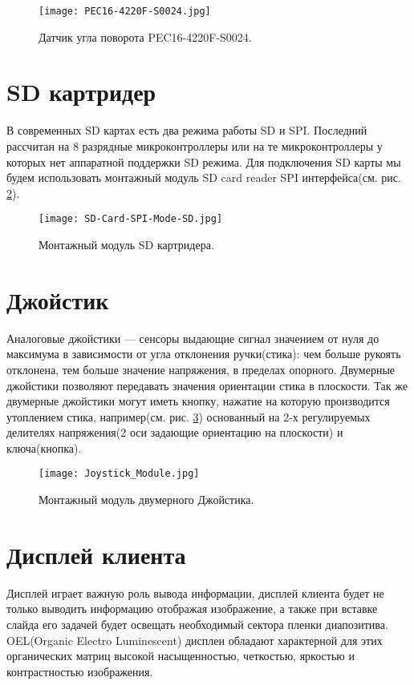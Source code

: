 \begin{figure}[ht]
	\centering
     \texttt{[image: PEC16-4220F-S0024.jpg]}
	\caption
	{
	Датчик угла поворота PEC16-4220F-S0024.
	}
	\label{fig:PEC16-4220F-S0024}
\end{figure}

\section{SD картридер}
В современных SD картах есть два режима работы SD и SPI. Последний рассчитан на 8 разрядные микроконтроллеры или  на те микроконтроллеры у которых нет аппаратной поддержки SD режима. Для подключения SD карты мы будем использовать монтажный модуль SD card reader SPI интерфейса(см. рис. \ref{fig:SDCardF}).
\begin{figure}[ht]
	\centering
     \texttt{[image: SD-Card-SPI-Mode-SD.jpg]}
	\caption
	{
	Монтажный модуль SD картридера.
	}
	\label{fig:SDCardF}
\end{figure}

\section{Джойстик}
Аналоговые джойстики — сенсоры выдающие сигнал значением от нуля до максимума в зависимости от угла отклонения ручки(стика): чем больше рукоять отклонена, тем больше значение напряжения, в пределах опорного. Двумерные джойстики позволяют передавать значения ориентации стика в плоскости. Так же двумерные джойстики могут иметь кнопку, нажатие на которую производится утоплением стика, например(см. рис. \ref{fig:JoystickModuleF}) основанный на 2-х регулируемых делителях напряжения(2 оси задающие ориентацию на плоскости) и ключа(кнопка).
\begin{figure}[ht]
	\centering
     \texttt{[image: Joystick\_Module.jpg]}
	\caption
	{
	Монтажный модуль двумерного Джойстика.
	}
	\label{fig:JoystickModuleF}
\end{figure}

\section{Дисплей клиента}
Дисплей играет важную роль вывода информации, дисплей клиента будет не только выводить информацию отображая изображение, а также при вставке слайда его задачей будет освещать необходимый сектора пленки диапозитива. OEL(Organic Electro Luminescent) дисплеи обладают характерной для этих органических матриц высокой насыщенностью, четкостью, яркостью и контрастностью изображения.

